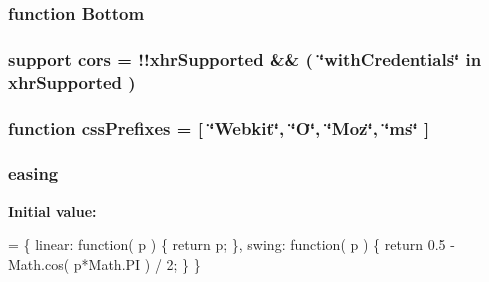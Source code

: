 \hypertarget{jquery-1_810_82_8js_aff76c1cba4a00c678dfce0e0c5a5538a}{
\subsubsection[{Bottom}]{\setlength{\rightskip}{0pt plus 5cm}function Bottom}}\label{jquery-1_810_82_8js_aff76c1cba4a00c678dfce0e0c5a5538a}
\hypertarget{jquery-1_810_82_8js_a4b8fe3fdfa8cb03b32c86e4a36575dfc}{
\subsubsection[{cors}]{ {\bf support} cors = !!{\bf xhr\-Supported} \&\& ( \char`\"{}with\-Credentials\char`\"{} in {\bf xhr\-Supported} )}}\label{jquery-1_810_82_8js_a4b8fe3fdfa8cb03b32c86e4a36575dfc}
\hypertarget{jquery-1_810_82_8js_a2ed3892172b336458b8074254f4471da}{
\subsubsection[{css\-Prefixes}]{\setlength{\rightskip}{0pt plus 5cm}function css\-Prefixes = \mbox{[} \char`\"{}Webkit\char`\"{}, \char`\"{}O\char`\"{}, \char`\"{}Moz\char`\"{}, \char`\"{}ms\char`\"{} \mbox{]}}}\label{jquery-1_810_82_8js_a2ed3892172b336458b8074254f4471da}
\hypertarget{jquery-1_810_82_8js_a9758a312629fa6de1744280dd6e6253b}{
\subsubsection[{easing}]{ easing}}\label{jquery-1_810_82_8js_a9758a312629fa6de1744280dd6e6253b}
{\bfseries Initial value\-:}
\begin{DoxyCode}
= \{
    linear: \textcolor{keyword}{function}( p ) \{
        \textcolor{keywordflow}{return} p;
    \},
    swing: \textcolor{keyword}{function}( p ) \{
        \textcolor{keywordflow}{return} 0.5 - Math.cos( p*Math.PI ) / 2;
    \}
\}
\end{DoxyCode}
